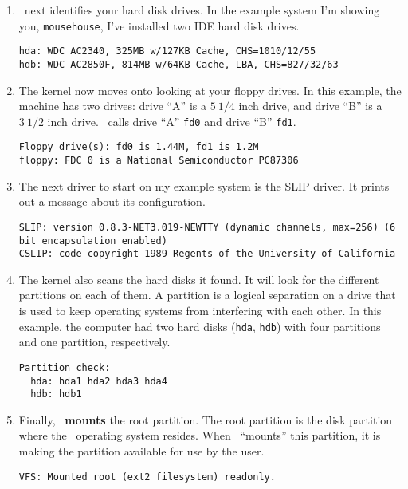 \begin{enumerate}
\item \linux\ next identifies your hard disk drives.  In the example
  system I'm showing you, {\tt mousehouse}, I've installed two IDE
  hard disk drives.
\begin{screen}\begin{verbatim}
hda: WDC AC2340, 325MB w/127KB Cache, CHS=1010/12/55
hdb: WDC AC2850F, 814MB w/64KB Cache, LBA, CHS=827/32/63
\end{verbatim}\end{screen}
  

\item The kernel now moves onto looking at your floppy drives. In this
example, the machine has two drives: drive ``A'' is
a $5\ {1/4}$ inch drive, and drive ``B'' is a $3\ {1/2}$ inch drive.
\linux\ calls drive ``A'' {\tt fd0} and drive ``B'' {\tt fd1}.
\begin{screen}\begin{verbatim}
Floppy drive(s): fd0 is 1.44M, fd1 is 1.2M
floppy: FDC 0 is a National Semiconductor PC87306
\end{verbatim}\end{screen}

\item The next driver to start on my example system is the SLIP
  driver.  It prints out a message about its configuration.
\begin{screen}\begin{verbatim}
SLIP: version 0.8.3-NET3.019-NEWTTY (dynamic channels, max=256) (6 bit encapsulation enabled)
CSLIP: code copyright 1989 Regents of the University of California
\end{verbatim}\end{screen}

  \item The kernel also scans the hard disks it found.  It will look
    for the different partitions on each of them.  A partition is a
    logical separation on a drive that is used to keep operating
    systems from interfering with each other. In this example, the
    computer had two hard disks ({\tt hda}, {\tt hdb}) with four
    partitions and one partition, respectively.
\begin{screen}\begin{verbatim}
Partition check:
  hda: hda1 hda2 hda3 hda4
  hdb: hdb1
\end{verbatim}\end{screen}

\item Finally, \linux\ {\bf mounts} the
  root partition.  The root partition is the disk partition where the
  \linux\ operating system resides.  When
  \linux\ ``mounts'' this partition, it is making the partition
  available for use by the user.
\begin{screen}\begin{verbatim}
VFS: Mounted root (ext2 filesystem) readonly.
\end{verbatim}\end{screen}
\end{enumerate} %
